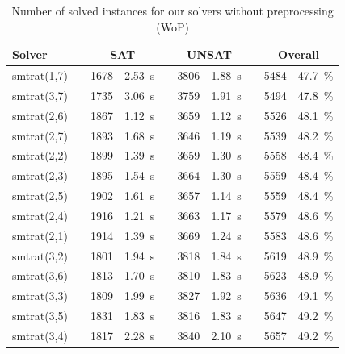 \begin{table}[]
    \caption{Number of solved instances for our solvers without preprocessing (WoP)}
    \centering
    \begin{tabularx}{\textwidth}{lXrrXrrXrr}
    	\toprule
    	\textbf{Solver}
    	&& \multicolumn{2}{c}{\textbf{SAT}}
    	&& \multicolumn{2}{c}{\textbf{UNSAT}}
    	&& \multicolumn{2}{c}{\textbf{Overall}}
    	\\
    	\midrule
    	\rowcolor{green!20}
    	smtrat(1,7)
    	&& 1678 & 2.53~s
    	&& 3806 & 1.88~s
    	&& 5484 & 47.7~\%
    	\\ 
    	\rowcolor{blue!20}
    	smtrat(3,7)
    	&& 1735 & 3.06~s
    	&& 3759 & 1.91~s
    	&& 5494 & 47.8~\%
    	\\
    	\rowcolor{red!20}
    	smtrat(2,6)
    	&& 1867 & 1.12~s
    	&& 3659 & 1.12~s
    	&& 5526 & 48.1~\%
    	\\
    	\rowcolor{red!20}
    	smtrat(2,7)
    	&& 1893 & 1.68~s
    	&& 3646 & 1.19~s
    	&& 5539 & 48.2~\%
    	\\
    	\rowcolor{red!20}
    	smtrat(2,2)
    	&& 1899 & 1.39~s
    	&& 3659 & 1.30~s
    	&& 5558 & 48.4~\%
    	\\
    	\rowcolor{red!20}
    	smtrat(2,3)
    	&& 1895 & 1.54~s
    	&& 3664 & 1.30~s
    	&& 5559 & 48.4~\%
    	\\
    	\rowcolor{red!20}
    	smtrat(2,5)
    	&& 1902 & 1.61~s
    	&& 3657 & 1.14~s
    	&& 5559 & 48.4~\%
    	\\
    	\rowcolor{red!20}
    	smtrat(2,4)
    	&& 1916 & 1.21~s
    	&& 3663 & 1.17~s
    	&& 5579 & 48.6~\%
    	\\
    	\rowcolor{red!20}
    	smtrat(2,1)
    	&& 1914 & 1.39~s
    	&& 3669 & 1.24~s
    	&& 5583 & 48.6~\%
    	\\
    	\rowcolor{blue!20}
    	smtrat(3,2)
    	&& 1801 & 1.94~s
    	&& 3818 & 1.84~s
    	&& 5619 & 48.9~\%
    	\\
    	\rowcolor{blue!20}
    	smtrat(3,6)
    	&& 1813 & 1.70~s
    	&& 3810 & 1.83~s
    	&& 5623 & 48.9~\%
    	\\
    	\rowcolor{blue!20}
    	smtrat(3,3)
    	&& 1809 & 1.99~s
    	&& 3827 & 1.92~s
    	&& 5636 & 49.1~\%
    	\\
    	\rowcolor{blue!20}
    	smtrat(3,5)
    	&& 1831 & 1.83~s
    	&& 3816 & 1.83~s
    	&& 5647 & 49.2~\%
    	\\
    	\rowcolor{blue!20}
    	smtrat(3,4)
    	&& 1817 & 2.28~s
    	&& 3840 & 2.10~s
    	&& 5657 & 49.2~\%
    	\\

\end{tabularx}
\end{table}
